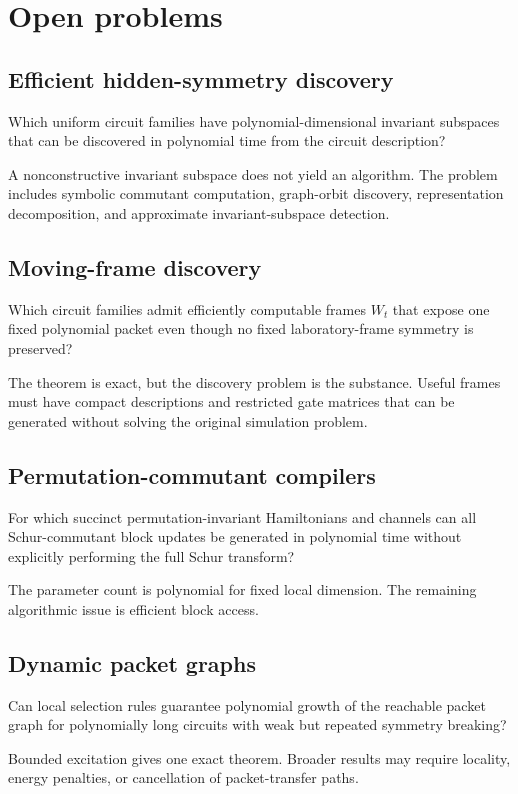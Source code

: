 \chapter{Open problems}
\label{ch:open-problems}

\section{Efficient hidden-symmetry discovery}
\begin{question}
Which uniform circuit families have polynomial-dimensional invariant subspaces that can be discovered in polynomial time from the circuit description?
\end{question}
A nonconstructive invariant subspace does not yield an algorithm. The problem includes symbolic commutant computation, graph-orbit discovery, representation decomposition, and approximate invariant-subspace detection.


\section{Moving-frame discovery}
\begin{question}
Which circuit families admit efficiently computable frames \(W_t\) that expose one fixed polynomial packet even though no fixed laboratory-frame symmetry is preserved?
\end{question}
The theorem is exact, but the discovery problem is the substance. Useful frames must have compact descriptions and restricted gate matrices that can be generated without solving the original simulation problem.

\section{Permutation-commutant compilers}
\begin{question}
For which succinct permutation-invariant Hamiltonians and channels can all Schur-commutant block updates be generated in polynomial time without explicitly performing the full Schur transform?
\end{question}
The parameter count is polynomial for fixed local dimension. The remaining algorithmic issue is efficient block access.

\section{Dynamic packet graphs}
\begin{question}
Can local selection rules guarantee polynomial growth of the reachable packet graph for polynomially long circuits with weak but repeated symmetry breaking?
\end{question}
Bounded excitation gives one exact theorem. Broader results may require locality, energy penalties, or cancellation of packet-transfer paths.

